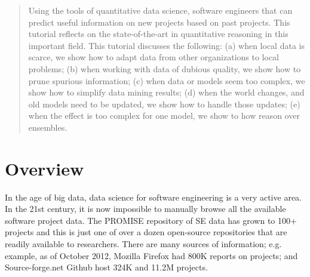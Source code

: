 \documentclass[conference]{IEEEtran}
\begin{document}
\maketitle


\begin{abstract}
Using the tools of quantitative data science, software engineers that can predict useful information on new projects based on past projects.  This tutorial reflects on the state-of-the-art in quantitative  reasoning in this important field. This  tutorial discusses the following:   (a) when local data is scarce, we show how to adapt data from other organizations to local problems; (b) when working with data of dubious quality, we show how to prune spurious information; (c) when data or models seem too complex, we show how to simplify   data mining results; (d) when the world changes, and old models need to be updated, we show how to handle those updates; (e) when the effect is too complex for one model, we show to how reason over ensembles.
\end{abstract}





%
\IEEEpeerreviewmaketitle
 
 \section{Overview}
 In the age of big data, data science for software engineering is a very active area.  In the 21st century, it is now impossible to manually browse all the available software project data. The PROMISE repository of SE data has grown to 100+ projects and this is just one of over a dozen open-source repositories that are readily available to researchers. There are many sources of information; e.g. example, as of October 2012, Mozilla Firefox had 800K reports on projects; and Source-forge.net Github host 324K and 11.2M projects.
\end{document}
